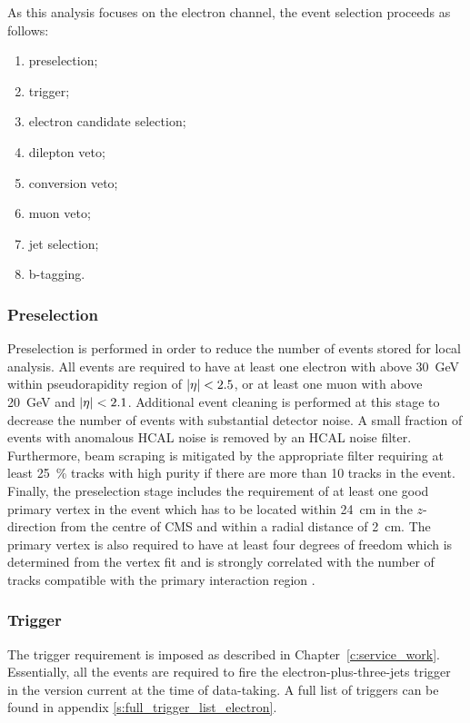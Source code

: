 As this analysis focuses on the electron channel, the event selection proceeds as follows:

\begin{enumerate}[topsep=\parskip, parsep=\parskip, itemsep=\parskip, leftmargin=\leftmargin]
	\item preselection;
	\item trigger;
	\item electron candidate selection;
	\item dilepton veto;
	\item conversion veto;
	\item muon veto;
	\item jet selection;
	\item b-tagging.
\end{enumerate}

\subsubsection*{Preselection}
Preselection is performed in order to reduce the number of events stored for local analysis. All events are required to
have at least one electron with \pt above \SI{30}{\GeV} within pseudorapidity region of $\lvert \eta \rvert < 2.5$, or at least
one muon with \pt above \SI{20}{\GeV} and $\lvert \eta \rvert < 2.1$. Additional event cleaning is performed at this stage to
decrease the number of events with substantial detector noise. A small fraction of events with anomalous HCAL noise is
removed by an HCAL noise filter. Furthermore, beam scraping is mitigated by the appropriate filter requiring at least
\SI{25}{\percent} tracks with high purity if there are more than \num{10} tracks in the event. Finally, the preselection
stage includes the requirement of at least one good primary vertex in the event which has to be located within
\SI{24}{\cm} in the $z$-direction from the centre of CMS and within a radial distance of \SI{2}{\cm}. The primary vertex
is also required to have at least four degrees of freedom which is determined from the vertex fit and is strongly
correlated with the number of tracks compatible with the primary interaction region \autocite{Tacking_PV_results_7TeV}.


\subsubsection*{Trigger}
The trigger requirement is imposed as described in Chapter~\ref{c:service_work}. Essentially, all the events are
required to fire the electron-plus-three-jets trigger in the version current at the time of data-taking. A full list of
triggers can be found in appendix \ref{s:full_trigger_list_electron}.

